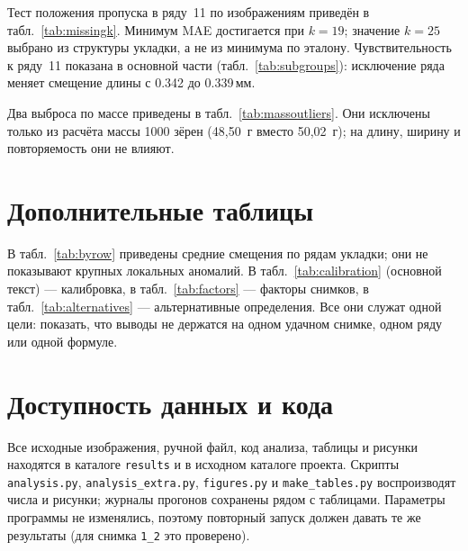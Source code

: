 \documentclass[12pt,a4paper]{article}
\begin{document}
Тест положения пропуска в ряду~11 по изображениям приведён в
табл.~\ref{tab:missingk}. Минимум MAE достигается при $k = 19$; значение
$k = 25$ выбрано из структуры укладки, а не из минимума по эталону.
Чувствительность к ряду~11 показана в основной части
(табл.~\ref{tab:subgroups}): исключение ряда меняет смещение длины с
\num{+0.342} до \num{+0.339}\,мм.

\begin{table}[htbp]
\centering\small
\caption{Зависимость MAE длины и корреляции от предполагаемого положения
пропуска $k$ в ряду~11.}
\label{tab:missingk}

\end{table}

Два выброса по массе приведены в табл.~\ref{tab:massoutliers}. Они
исключены только из расчёта массы 1000 зёрен (48,50~г вместо 50,02~г);
на длину, ширину и повторяемость они не влияют.

\begin{table}[htbp]
\centering\small
\caption{Выбросы ручной массы (в валидации длины и ширины не
используются).}
\label{tab:massoutliers}

\end{table}

\section{Дополнительные таблицы}

В табл.~\ref{tab:byrow} приведены средние смещения по рядам укладки;
они не показывают крупных локальных аномалий. В табл.~\ref{tab:calibration}
(основной текст) — калибровка, в табл.~\ref{tab:factors} — факторы
снимков, в табл.~\ref{tab:alternatives} — альтернативные определения.
Все они служат одной цели: показать, что выводы не держатся на одном
удачном снимке, одном ряду или одной формуле.

\begin{table}[htbp]
\centering\small
\caption{Средние смещения по рядам укладки (среднее по восьми снимкам).}
\label{tab:byrow}

\end{table}

\section*{Доступность данных и кода}

Все исходные изображения, ручной файл, код анализа, таблицы и рисунки
находятся в каталоге \texttt{results} и в исходном каталоге проекта.
Скрипты \texttt{analysis.py}, \texttt{analysis\_extra.py},
\texttt{figures.py} и \texttt{make\_tables.py} воспроизводят числа и
рисунки; журналы прогонов сохранены рядом с таблицами. Параметры
программы не изменялись, поэтому повторный запуск должен давать те же
результаты (для снимка \texttt{1\_2} это проверено).
\end{document}
